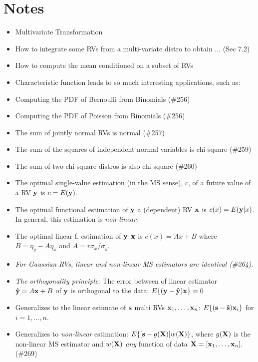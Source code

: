 \documentclass[a4paper]{book}
\begin{document}
\section{Notes}
\begin{itemize}
\item Multivariate Transformation
\item How to integrate some RVs from a multi-variate distro to obtain ... (Sec 7.2)
\item How to compute the mean conditioned on a subset of RVs
\item Characteristic function leads to so much interesting applications, such as:
	\item Computing the PDF of Bernoulli from Binomials (\#256)
	\item Computing the PDF of Poisson from Binomials (\#256)
	\item The sum of jointly normal RVs is normal (\#257)
	\item The sum of the squares of independent normal variables is chi-square (\#259)
	\item The sum of two chi-square distros is also chi-square (\#260)
\item The optimal single-value estimation (in the MS sense), $c$, of a future value of a RV $\mathbf{y}$ is $c=E(\mathbf{y})$.
\item The optimal functional estimation of $\mathbf{y}$ \ito a (dependent) RV $\mathbf{x}$ is $c(x)=E(\mathbf{y}|x)$. In general, this estimation is \textit{non-linear}.
\item The optimal linear f. estimation of $\mathbf{y}$ \ito $\mathbf{x}$ is $c(x) = Ax + B$ where $B = \eta_y - A\eta_x$ and $A = r \sigma_x/\sigma_y$. 
\item \textit{For Gaussian RVs, linear and non-linear MS estimators are identical (\#264)}.
\item \textit{The orthogonality principle}: The error between of linear estimator $\mathbf{\hat{y}}=A\mathbf{x}+B$ of $\mathbf{y}$ is orthogonal to the data: $E\{(\mathbf{y}-\mathbf{\hat{y}})\mathbf{x}\}=0$
	\item Generalizes to the linear estimate of $\mathbf{s}$ \ito multi RVs $\mathbf{x}_1, \hdots, \mathbf{x}_n$: $E\{(\mathbf{s}-\mathbf{\hat{s}})\mathbf{x}_i\}$ for $i=1,\hdots,n$.
	\item Generalizes to \textit{non-linear} estimation: $E\{[\mathbf{s}-g(\mathbf{X})]w(\mathbf{X})\}$, where $g(\mathbf{X})$ is the non-linear MS estimator and $w(\mathbf{X})$ \textit{any} function of data $\mathbf{X}=[\mathbf{x}_1,\hdots,\mathbf{x}_n]$. (\#269)

\end{itemize}
\end{document}
